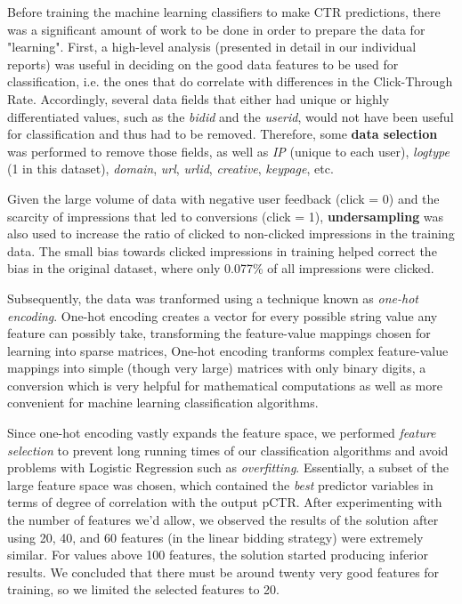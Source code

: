 \documentclass{sig-alternate-05-2015}
\begin{document}
Before training the machine learning classifiers to make CTR predictions, there was a significant amount of work to be done in order to prepare the data for "learning". First, a high-level analysis (presented in detail in our individual reports) was useful in deciding on the good data features to be used for classification, i.e. the ones that do correlate with differences in the Click-Through Rate. Accordingly, several data fields that either had unique or highly differentiated values, such as the \textit{bidid} and the \textit{userid}, would not have been useful for classification and thus had to be removed. Therefore, some \textbf{data selection} was performed to remove those fields, as well as \textit{IP} (unique to each user), \textit{logtype} (1 in this dataset), \textit{domain}, \textit{url}, \textit{urlid}, \textit{creative}, \textit{keypage}, etc.

Given the large volume of data with negative user feedback (click = 0) and the scarcity of impressions that led to conversions (click = 1), \textbf{undersampling} was also used to increase the ratio of clicked to non-clicked impressions in the training data. The small bias towards clicked impressions in training helped correct the bias in the original dataset, where only 0.077\% of all impressions were clicked.

Subsequently, the data was tranformed using a technique known as \textit{one-hot encoding}. One-hot encoding creates a vector for every possible string value any feature can possibly take, transforming the feature-value mappings chosen for learning into sparse matrices, One-hot encoding tranforms complex feature-value mappings into simple (though very large) matrices with only binary digits, a conversion which is very helpful for mathematical computations as well as more convenient for machine learning classification algorithms.

Since one-hot encoding vastly expands the feature space, we performed \textit{feature selection} to prevent long running times of our classification algorithms and avoid problems with Logistic Regression such as \textit{overfitting}. Essentially, a subset of the large feature space was chosen, which contained the \textit{best} predictor variables in terms of degree of correlation with the output pCTR. After experimenting with the number of features we'd allow, we observed the results of the solution after using 20, 40, and 60 features (in the linear bidding strategy) were extremely similar. For values above 100 features, the solution started producing inferior results. We concluded that there must be around twenty very good features for training, so we limited the selected features to 20.
\end{document}
